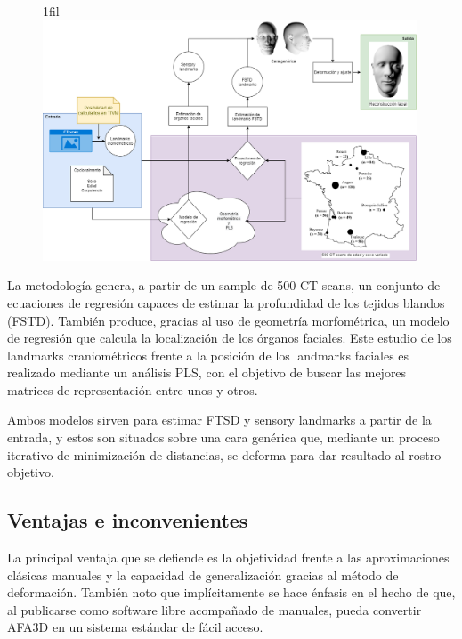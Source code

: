 \documentclass[13pt,a4paper]{article}
\makeatletter
\newcommand*{\centerfloat}{%
  \parindent \z@
  \leftskip \z@ \@plus 1fil \@minus \textwidth
  \rightskip\leftskip
  \parfillskip \z@skip}
\makeatother
\begin{document}

\begin{figure}[ht]
  \centerfloat
  \includegraphics[width=0.99\textwidth]{img/methodology.png}
\end{figure}

La metodología genera, a partir de un sample de 500 CT scans, un conjunto de ecuaciones de regresión capaces de estimar la profundidad de los tejidos blandos (FSTD). También produce, gracias al uso de geometría morfométrica, un modelo de regresión que calcula la localización de los órganos faciales.
Este estudio de los landmarks craniométricos frente a la posición de los landmarks faciales es realizado mediante un análisis PLS, con el objetivo de buscar las mejores matrices de representación entre unos y otros.

Ambos modelos sirven para estimar FTSD y sensory landmarks a partir de la entrada, y estos son situados sobre una cara genérica que, mediante un proceso iterativo de minimización de distancias, se deforma para dar resultado al rostro objetivo.

\subsection{Ventajas e inconvenientes}

La principal ventaja que se defiende es la objetividad frente a las aproximaciones clásicas manuales y la capacidad de generalización gracias al método de deformación. También noto que implícitamente se hace énfasis en el hecho de que, al publicarse como software libre acompañado de manuales, pueda convertir AFA3D en un sistema estándar de fácil acceso.
\end{document}
